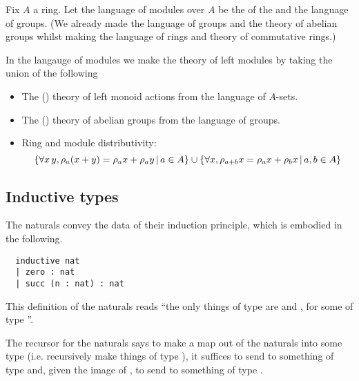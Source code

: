 \begin{dfn}[Modules]
  Fix $A$ a ring.
  Let the language of modules over $A$ be the 
  of the  and the language of groups.
  (We already made the language of groups and the theory of abelian groups
  whilst making the language of rings and theory of commutative rings.)

  In the langauge of modules we make the theory of left modules by taking the
  union of the following
  \begin{itemize}
    \item The () theory of left monoid actions
          from the language of $A$-sets.
    \item The () theory of abelian groups
          from the language of groups.
    \item Ring and module distributivity:
          \[
            \left\{ \forall x \, y, \rho_{a} (x + y) = \rho_{a} x + \rho_{a} y \,|\, a \in A \right\}
            \cup
            \left\{ \forall x, \rho_{a + b} x = \rho_{a} x + \rho_{b} x \,|\, a , b \in A \right\}
          \]
  \end{itemize}
\end{dfn}

\subsection{Inductive types}

\begin{dfn}

  The naturals convey the data of their induction principle,
  which is embodied in the following.

  \begin{lstlisting}
  inductive nat
  | zero : nat
  | succ (n : nat) : nat \end{lstlisting}
  This definition of the naturals reads
  ``the only things of type  are
   and ,
  for some  of type ''.
\end{dfn}

The recursor for the naturals says to make a map out of the naturals
into some type  (i.e. recursively make things of type ),
it suffices to send  to something of type 
and, given the image of ,
to send  to something of type .

